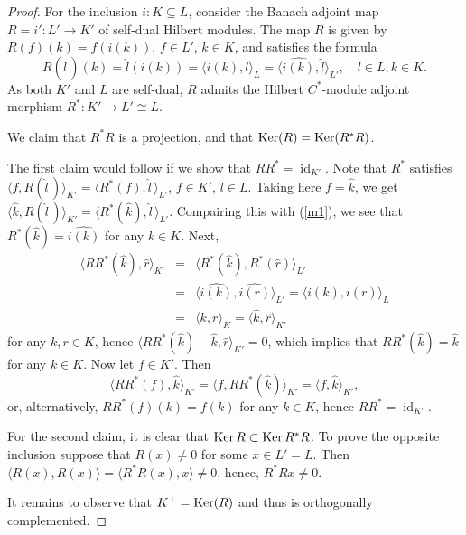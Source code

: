 \documentclass[12pt]{amsart}
\newcommand{\id}{\operatorname{id}}
\newcommand{\Ker}{\operatorname{Ker}}
\def\<{\langle}
\def\>{\rangle}
\def\Ker{\mathop{\rm Ker}\nolimits}
\begin{document}
\begin{proof}
For the inclusion $i:K\subseteq L$,
consider the Banach adjoint map $R=i': L' \to K'$ of self-dual Hilbert modules. The map $R$
is given by $R(f)(k)=f(i(k))$, $f\in L'$, $k\in K$, and 
satisfies the formula 
\begin{equation}\label{m1}
R(\widehat{l}\,)(k)=\widehat{l}(i(k))=\langle i(k),l\rangle_L=\langle \widehat{i(k)},\widehat{l}\rangle_{L'}, \quad l\in L, k\in K. 
\end{equation}
As both $K'$ and $L$ are self-dual, $R$
admits the Hilbert $C^*$-module adjoint morphism $R^*: K' \to L'\cong L$.

We claim that $R^*R$ is a projection, and that $\Ker(R)=\Ker(R^*R)$. 

The first claim would follow if we show that $RR^*=\id_{K'}$. Note that $R^*$ satisfies $\langle f,R(\widehat{l}\,)\rangle_{K'}=\langle R^*(f),\widehat{l}\,\rangle_{L'}$, $f\in K'$, $l\in L$. Taking here $f=\widehat{k}$, we get $\langle \widehat{k},R(\widehat{l}\,)\rangle_{K'}=\langle R^*(\widehat{k}),\widehat{l}\,\rangle_{L'}$. Compairing this with (\ref{m1}), we see that $R^*(\widehat{k})=\widehat{i(k)}$ for any $k\in K$. Next,
\begin{eqnarray*}
\langle RR^*(\widehat{k}),\widehat{r}\rangle_{K'}&=&\langle R^*(\widehat{k}),R^*(\widehat{r})\rangle_{L'}\\
&=&\langle \widehat{i(k)},\widehat{i(r)}\rangle_{L'}=\langle i(k),i(r)\rangle_{L}\\
&=&\langle k,r\rangle_{K}=\langle \widehat{k},\widehat{r}\rangle_{K'} 
\end{eqnarray*}
for any $k,r\in K$, hence $\langle RR^*(\widehat{k})-\widehat{k},\widehat{r}\rangle_{K'}=0$, which implies that $RR^*(\widehat{k})=\widehat{k}$ for any $k\in K$.  
Now let $f\in K'$. Then
$$
\langle RR^*(f),\widehat{k}\rangle_{K'}=\langle f,RR^*(\widehat{k})\rangle_{K'}=\langle f,\widehat{k}\rangle_{K'},
$$
or, alternatively, $RR^*(f)(k)=f(k)$ for any $k\in K$, hence $RR^*=\id_{K'}$. 

For the second claim, it is clear that $\Ker R\subset\Ker R^*R$. To prove the opposite inclusion suppose that $R(x)\neq 0$ for some $x\in L'=L$. Then $\<R(x),R(x)\>=\<R^*R(x),x\>\ne 0$, hence, $R^*Rx\ne 0$.


It remains to observe that $K^\bot = \Ker(R)$ and thus is orthogonally
complemented.
\end{proof}	
\end{document}
